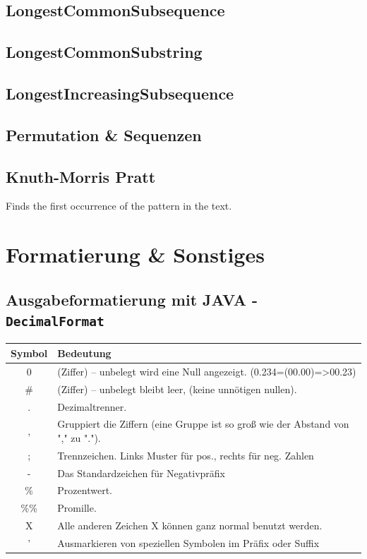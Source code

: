 \documentclass[10pt,a4paper,ngerman,oneside,]{article}
\begin{document}
\begin{multicols}{2}
\subsection{LongestCommonSubsequence}

\subsection{LongestCommonSubstring}

\subsection{LongestIncreasingSubsequence}

\subsection{Permutation \& Sequenzen}

\subsection{Knuth-Morris Pratt}
Finds the first occurrence of the pattern in the text.
\section{Formatierung \& Sonstiges}
\subsection{Ausgabeformatierung mit JAVA - \texttt{DecimalFormat}}
\begin{tabular}{cl}
Symbol & Bedeutung\\\hline
0 &	(Ziffer) – unbelegt wird eine Null angezeigt. (0.234=(00.00)=>00.23)\\
\# &	(Ziffer) – unbelegt bleibt leer, (keine unnötigen nullen).\\
. &	Dezimaltrenner. \\
, &	Gruppiert die Ziffern (eine Gruppe ist so groß wie der Abstand von "," zu ".").\\
; &	Trennzeichen. Links Muster für pos., rechts für neg. Zahlen\\
- &	Das Standardzeichen für Negativpräfix\\
\% &	Prozentwert.\\
\%\% &	Promille.\\
X &	Alle anderen Zeichen X können ganz normal benutzt werden.\\
' &	Ausmarkieren von speziellen Symbolen im Präfix oder Suffix \\
\end{tabular}

\end{multicols}
\end{document}
